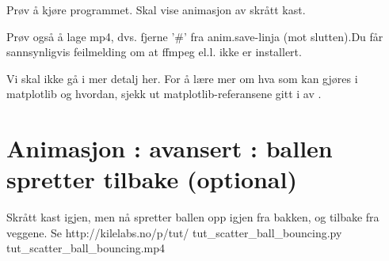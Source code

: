 Prøv å kjøre programmet. Skal vise animasjon av skrått kast. 

Prøv også å lage mp4, dvs. fjerne '\#' fra anim.save-linja (mot slutten).Du får sannsynligvis feilmelding om at ffmpeg el.l. ikke er installert. 

Vi skal ikke gå i mer detalj her. For å lære mer om hva som kan gjøres i matplotlib og hvordan, sjekk ut matplotlib-referansene gitt i av \cite{section:matplotlib}. 

\section{Animasjon : avansert : ballen spretter tilbake  (optional)}

Skrått kast igjen, men nå spretter ballen opp igjen fra bakken, og tilbake fra veggene.
Se http://kilelabs.no/p/tut/
tut\_{}scatter\_{}ball\_{}bouncing.py 
tut\_{}scatter\_{}ball\_{}bouncing.mp4

